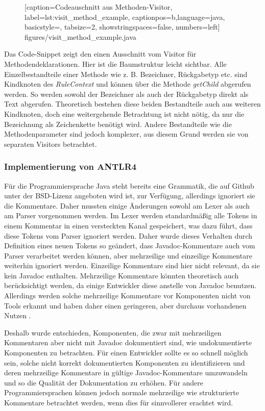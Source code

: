 		\begin{figure} [htbp]
			
			[caption={Codeauschnitt aus  Methoden-Visitor},
			label={lst:visit_method_example},
			captionpos=b,language=java, basicstyle=\footnotesize, tabsize=2, showstringspaces=false,  numbers=left]
			{figures/visit_method_example.java}
		\end{figure}
Das Code-Snippet zeigt den einen Ausschnitt vom Visitor für Methodendeklarationen. Hier ist die Baumstruktur leicht sichtbar. Alle Einzelbestandteile einer Methode wie z. B. Bezeichner, Rückgabetyp etc. sind Kindknoten des \textit{RuleContext} und können über die Methode \textit{getChild} abgerufen werden. So werden sowohl der Bezeichner als auch der Rückgabetyp direkt als Text abgerufen. Theoretisch bestehen diese beiden Bestandteile auch aus weiteren Kindknoten, doch eine weitergehende Betrachtung ist nicht nötig, da nur die Bezeichnung als Zeichenkette benötigt wird. Andere Bestandteile wie die Methodenparameter sind jedoch komplexer, aus diesem Grund werden sie von separaten Visitors betrachtet.

\subsubsection{Implementierung von ANTLR4}
Für die Programmiersprache Java steht bereits eine Grammatik, die auf Github unter der BSD-Lizenz angeboten wird ist, zur Verfügung\cite{antlr_grammar_github}, allerdings ignoriert sie die Kommentare. Daher mussten einige Änderungen sowohl am Lexer als auch am Parser vorgenommen werden. Im Lexer werden standardmäßig alle Tokens in einem Kommentar in einen versteckten Kanal gespeichert, was dazu führt, dass diese Tokens vom Parser ignoriert werden. Daher wurde dieses Verhalten durch Definition eines neuen Tokens so geändert, dass Javadoc-Kommentare auch vom Parser verarbeitet werden können, aber mehrzeilige und einzeilige Kommentare weiterhin ignoriert werden. Einzeilige Kommentare sind hier nicht relevant, da sie kein Javadoc enthalten. Mehrzeilige Kommentare könnten theoretisch auch berücksichtigt werden, da einige Entwickler diese anstelle von Javadoc benutzen. Allerdings werden solche mehrzeilige Kommentare vor Komponenten nicht von Tools erkannt und haben daher einen geringeren, aber durchaus vorhandenen Nutzen \cite[S. 4]{HowDocumentationEvolvesoverTime}.

Deshalb wurde entschieden, Komponenten, die zwar mit mehrzeiligen Kommentaren aber nicht mit Javadoc dokumentiert sind, wie undokumentierte Komponenten zu betrachten. Für einen Entwickler sollte es so schnell möglich sein, solche nicht korrekt dokumentierten Komponenten zu identifizieren und deren mehrzeilige Kommentare in gültige Javadoc-Kommentare umzuwandeln und so die Qualität der Dokumentation zu erhöhen. Für andere Programmiersprachen können jedoch normale mehrzeilige wie strukturierte Kommentare betrachtet werden, wenn dies für sinnvollerer erachtet wird.

